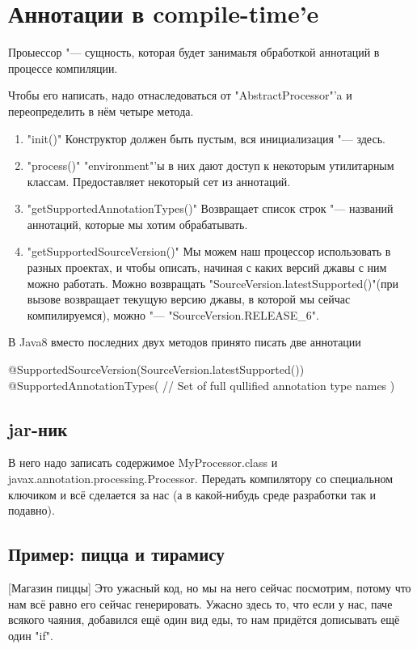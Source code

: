 \section{Аннотации в compile-time'e}
Проыессор "--- сущность, которая будет занимаьтя обработкой аннотаций в процессе компиляции.

Чтобы его написать, надо отнаследоваться от \java"AbstractProcessor"'a 
и переопределить в нём четыре метода.

\begin{enumerate}
\item
\java"init()"
Конструктор должен быть пустым, вся инициализация "--- здесь.
\item
\java"process()"
\java"environment"'ы в них дают доступ к некоторым утилитарным классам.
Предоставляет некоторый сет из аннотаций.
\item
\java"getSupportedAnnotationTypes()"
Возвращает список строк "--- названий аннотаций, которые мы хотим обрабатывать.
\item
\java"getSupportedSourceVersion()"
Мы можем наш процессор использовать в разных проектах, и чтобы описать,
начиная с каких версий джавы с ним можно работать.
Можно возвращать \java"SourceVersion.latestSupported()"(при вызове возвращает текущую версию джавы, в которой мы сейчас компилируемся), 
можно "--- \java"SourceVersion.RELEASE_6".
\end{enumerate}
В Java8 вместо последних двух методов принято писать две аннотации
\begin{javacode}
@SupportedSourceVersion(SourceVersion.latestSupported())
@SupportedAnnotationTypes({
	// Set of full qullified annotation type names
})
\end{javacode}

\subsection{jar-ник}
В него надо записать содержимое MyProcessor.class и javax.annotation.processing.Processor.
Передать компилятору со специальном ключиком и всё сделается за нас 
(а в какой-нибудь среде разработки так и подавно).

\subsection{Пример: пицца и тирамису}
[Магазин пиццы]
Это ужасный код, но мы на него сейчас посмотрим, потому что нам всё равно его сейчас генерировать.
Ужасно здесь то, что если у нас, паче всякого чаяния,
 добавился ещё один вид еды, то нам придётся дописывать ещё один \java"if". %

